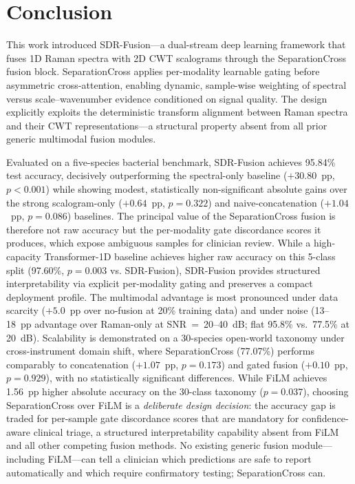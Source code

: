 \documentclass[preprint,12pt]{elsarticle}
\begin{document}
\section{Conclusion}
\label{sec:conclusion}

This work introduced SDR-Fusion---a dual-stream deep learning framework
that fuses 1D Raman spectra with 2D CWT scalograms through the
SeparationCross fusion block. SeparationCross applies per-modality
learnable gating before asymmetric cross-attention, enabling dynamic,
sample-wise weighting of spectral versus scale--wavenumber evidence
conditioned on signal quality. The design explicitly exploits the
deterministic transform alignment between Raman spectra and their CWT
representations---a structural property absent from all prior generic
multimodal fusion modules.

Evaluated on a five-species bacterial benchmark, SDR-Fusion achieves
95.84\% test accuracy, decisively outperforming the spectral-only
baseline ($+30.80$~pp, $p{<}0.001$) while showing modest, statistically
non-significant absolute gains over the strong scalogram-only
($+0.64$~pp, $p{=}0.322$) and naive-concatenation ($+1.04$~pp,
$p{=}0.086$) baselines. The principal value of the SeparationCross
fusion is therefore not raw accuracy but the per-modality gate
discordance scores it produces, which expose ambiguous samples for
clinician review. While a high-capacity Transformer-1D baseline achieves higher raw
accuracy on this 5-class split (97.60\%, $p{=}0.003$ vs. SDR-Fusion),
SDR-Fusion provides structured interpretability via explicit
per-modality gating and preserves a compact deployment profile.
The multimodal advantage
is most pronounced under data scarcity ($+5.0$~pp over no-fusion at 20\% training
data) and under noise (13--18~pp advantage over Raman-only at SNR~=~20--40~dB;
flat 95.8\% vs.\ 77.5\% at 20~dB). Scalability is demonstrated on a 30-species open-world
taxonomy under cross-instrument domain shift, where SeparationCross
(77.07\%) performs comparably to concatenation ($+1.07$~pp, $p{=}0.173$) and
gated fusion ($+0.10$~pp, $p{=}0.929$), with no statistically significant
differences. While FiLM achieves 1.56~pp
higher absolute accuracy on the 30-class taxonomy ($p{=}0.037$), choosing
SeparationCross over FiLM is a \textit{deliberate design decision}:
the accuracy gap is traded for per-sample gate discordance scores
that are mandatory for confidence-aware clinical triage, a structured
interpretability capability absent from FiLM and all other competing
fusion methods. No existing generic fusion module---including
FiLM---can tell a clinician which predictions are safe to report
automatically and which require confirmatory testing; SeparationCross
can.
\end{document}
